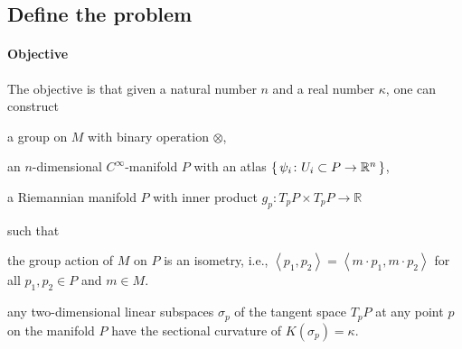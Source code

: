 \documentclass[../methodology.tex]{subfiles}
\begin{document}
\subsection{Define the problem}
\paragraph{Objective}\label{Objective}
The objective is that
given a natural number \(n\) and a real number \(\kappa\),
one can construct
\begin{APAenumerate}
    \item a group on \(M\) with binary operation \(\otimes\),
    \item an \(n\)-dimensional \(C^\infty\)-manifold \(P\) with an atlas \(\set{\psi_i \colon U_i \subset P \to \mathbb{R}^n}\),
    \item a Riemannian manifold \(P\) with inner product \(g_p \colon T_p P \times T_p P \to \mathbb{R}\)
\end{APAenumerate}
such that
\begin{APAitemize}
    \item the group action of \(M\) on \(P\) is an isometry, i.e., \(\left\langle p_1, p_2\right\rangle = \left\langle m \cdot p_1, m \cdot p_2\right\rangle\) for all \(p_1, p_2 \in P\) and \(m \in M\).
    \item any two-dimensional linear subspaces \(\sigma_p\) of the tangent space \(T_p P\) at any point \(p\) on the manifold \(P\) have the sectional curvature of \(K\left(\sigma_p\right)=\kappa\).
\end{APAitemize}
\end{document}
